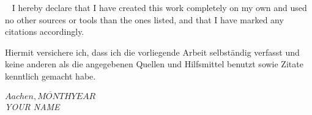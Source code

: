 



~
\vfill
I hereby declare that I have created this work completely on my own and used no other sources or tools than the ones listed, and that I have marked any citations accordingly.

Hiermit versichere ich, dass ich die vorliegende Arbeit selbst\"andig verfasst und keine anderen als die angegebenen Quellen und Hilfsmittel benutzt sowie Zitate kenntlich gemacht habe. 

\begin{flushright}
\vspace{12mm}
$\overline{Aachen, MONTH \mathit{YEAR}}$\\
\textit{YOUR NAME}
\end{flushright}
